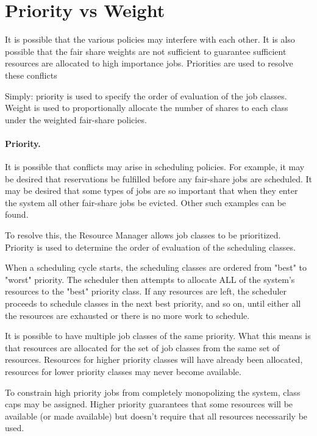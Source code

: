    \section{Priority vs Weight}

    It is possible that the various policies may interfere with each other. It is also possible that
    the fair share weights are not sufficient to guarantee sufficient resources are allocated to
    high importance jobs. Priorities are used to resolve these conflicts

    Simply: priority is used to specify the order of evaluation of the job classes. Weight is used
    to proportionally allocate the number of shares to each class under the weighted fair-share
    policies.

    \paragraph{Priority.} It is possible that conflicts may arise in scheduling policies. For example, it may be
    desired that reservations be fulfilled before any fair-share jobs are scheduled. It may be
    desired that some types of jobs are so important that when they enter the system all other
    fair-share jobs be evicted. Other such examples can be found.
    
    To resolve this, the Resource Manager allows job classes to be prioritized. Priority is
    used to determine the order of evaluation of the scheduling classes.
    
    When a scheduling cycle starts, the scheduling classes are ordered from "best" to "worst" priority. 
    The scheduler then attempts to allocate ALL of the system's resources to the "best" priority class. 
    If any resources are left, the scheduler proceeds to schedule classes in the next best
    priority, and so on, until either all the 
    resources are exhausted or there is no more work to schedule. 
    
    It is possible to have multiple job classes of the same priority. What this means is that resources 
    are allocated for the set of job classes from the same set of resources. Resources for higher priority 
    classes will have already been allocated, resources for lower priority classes may never become 
    available. 
    
    To constrain high priority jobs from completely monopolizing the system, class caps may be 
    assigned. Higher priority guarantees that some resources will be available (or made available) but 
    doesn't require that all resources necessarily be used. 

